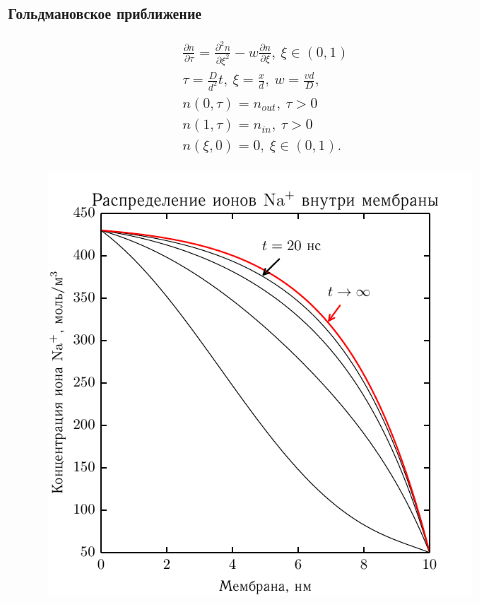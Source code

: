 \documentclass[10pt]{beamer}
\newcommand{\pder}[2] {\frac{\partial #1}{\partial #2}}
\newcommand{\ppder}[2]{\frac{\partial^2 #1}{\partial {#2}^2}}
\begin{document}
\begin{frame}
      \textbf{Гольдмановское приближение}

      \begin{minipage}{.47\textwidth}
\begingroup
\everymath{\scriptstyle}
\scriptsize
        \begin{align*}
            & \pder{n}{\tau} = \ppder{n}{\xi} -
                w\pder{n}{\xi},\ \xi\in(0,1) \\
            & \tau = \frac{D}{d^2}t,\ \xi = \frac{x}{d},\ w = \frac{vd}{D},\\
            & n(0, \tau) = n_{out},\ \tau>0 \\
            & n(1, \tau) = n_{in},\ \tau>0 \\
            & n(\xi, 0) = 0,\ \xi\in(0,1).
        \end{align*}
\endgroup
    \end{minipage}\hfill
      \begin{minipage}{.3\textwidth}
     \begin{figure}[H]
    \begin{center}
        \includegraphics[width=\textwidth]{../plots/linear_field}
    \end{center}
    \end{figure}
\end{minipage}


  \end{frame}
\end{document}
